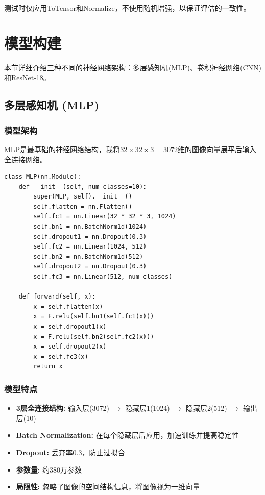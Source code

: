 \documentclass[12pt,a4paper]{article}
\begin{document}
测试时仅应用ToTensor和Normalize，不使用随机增强，以保证评估的一致性。

\section{模型构建}

本节详细介绍三种不同的神经网络架构：多层感知机(MLP)、卷积神经网络(CNN)和ResNet-18。

\subsection{多层感知机 (MLP)}

\subsubsection{模型架构}

MLP是最基础的神经网络结构，我将$32 \times 32 \times 3 = 3072$维的图像向量展平后输入全连接网络。

\begin{lstlisting}[caption={MLP模型定义},label={lst:mlp}]
class MLP(nn.Module):
    def __init__(self, num_classes=10):
        super(MLP, self).__init__()
        self.flatten = nn.Flatten()
        self.fc1 = nn.Linear(32 * 32 * 3, 1024)
        self.bn1 = nn.BatchNorm1d(1024)
        self.dropout1 = nn.Dropout(0.3)
        self.fc2 = nn.Linear(1024, 512)
        self.bn2 = nn.BatchNorm1d(512)
        self.dropout2 = nn.Dropout(0.3)
        self.fc3 = nn.Linear(512, num_classes)
        
    def forward(self, x):
        x = self.flatten(x)
        x = F.relu(self.bn1(self.fc1(x)))
        x = self.dropout1(x)
        x = F.relu(self.bn2(self.fc2(x)))
        x = self.dropout2(x)
        x = self.fc3(x)
        return x
\end{lstlisting}

\subsubsection{模型特点}

\begin{itemize}[leftmargin=2em]
    \item \textbf{3层全连接结构:} 输入层(3072) $\rightarrow$ 隐藏层1(1024) $\rightarrow$ 隐藏层2(512) $\rightarrow$ 输出层(10)
    \item \textbf{Batch Normalization:} 在每个隐藏层后应用，加速训练并提高稳定性
    \item \textbf{Dropout:} 丢弃率0.3，防止过拟合
    \item \textbf{参数量:} 约380万参数
    \item \textbf{局限性:} 忽略了图像的空间结构信息，将图像视为一维向量
\end{itemize}
\end{document}
